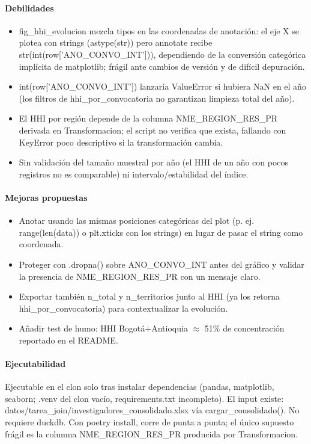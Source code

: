 \paragraph{Debilidades}
\begin{itemize}
  \item fig\_hhi\_evolucion mezcla tipos en las coordenadas de anotación: el eje X se plotea con strings (astype(str)) pero annotate recibe str(int(row['ANO\_CONVO\_INT'])), dependiendo de la conversión categórica implícita de matplotlib; frágil ante cambios de versión y de difícil depuración.
  \item int(row['ANO\_CONVO\_INT']) lanzaría ValueError si hubiera NaN en el año (los filtros de hhi\_por\_convocatoria no garantizan limpieza total del año).
  \item El HHI por región depende de la columna NME\_REGION\_RES\_PR derivada en Transformacion; el script no verifica que exista, fallando con KeyError poco descriptivo si la transformación cambia.
  \item Sin validación del tamaño muestral por año (el HHI de un año con pocos registros no es comparable) ni intervalo/estabilidad del índice.
\end{itemize}

\paragraph{Mejoras propuestas}
\begin{itemize}
  \item Anotar usando las mismas posiciones categóricas del plot (p. ej. range(len(data)) o plt.xticks con los strings) en lugar de pasar el string como coordenada.
  \item Proteger con .dropna() sobre ANO\_CONVO\_INT antes del gráfico y validar la presencia de NME\_REGION\_RES\_PR con un mensaje claro.
  \item Exportar también n\_total y n\_territorios junto al HHI (ya los retorna hhi\_por\_convocatoria) para contextualizar la evolución.
  \item Añadir test de humo: HHI Bogotá+Antioquia $\approx$ 51\% de concentración reportado en el README.
\end{itemize}

\paragraph{Ejecutabilidad}
Ejecutable en el clon solo tras instalar dependencias (pandas, matplotlib, seaborn; .venv del clon vacío, requirements.txt incompleto). El input existe: datos/tarea\_join/investigadores\_consolidado.xlsx vía cargar\_consolidado(). No requiere duckdb. Con poetry install, corre de punta a punta; el único supuesto frágil es la columna NME\_REGION\_RES\_PR producida por Transformacion.

